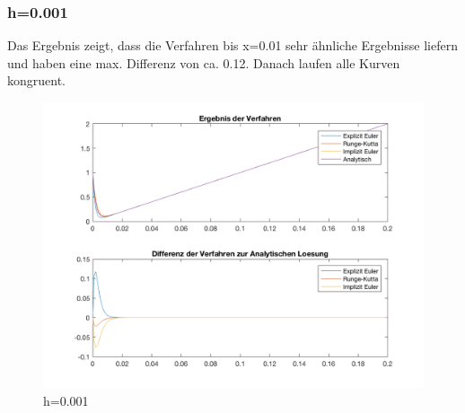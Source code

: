 \documentclass[]{scrartcl}
\begin{document}
\subsubsection{h=0.001}
Das Ergebnis zeigt, dass die Verfahren bis x=0.01 sehr ähnliche Ergebnisse liefern und haben eine max. Differenz von ca. 0.12. Danach laufen alle Kurven kongruent.
\begin{figure}[H]
\centering
\includegraphics[width=1\linewidth]{a1_1_1}
\caption{h=0.001}
\label{fig:a1_1_1}
\end{figure}
\end{document}
